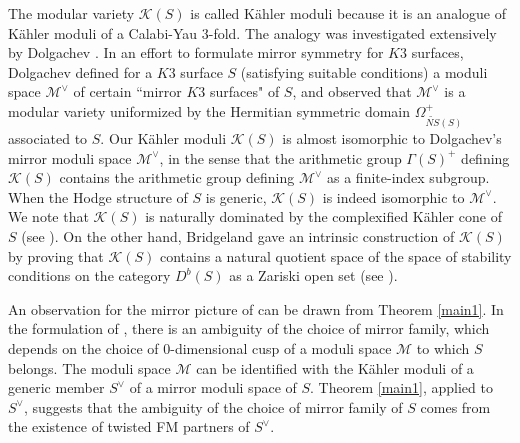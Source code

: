 \documentclass{article}
\theoremstyle{plain}
\theoremstyle{definition}
\theoremstyle{remark}
\begin{document}
The modular variety $\mathcal{K} (S)$ is called K\"ahler moduli  
because it is an analogue of K\"ahler moduli of a Calabi-Yau $3$-fold.   
The analogy was investigated extensively by Dolgachev \cite{Do}.  
In an effort to formulate mirror symmetry for $K3$ surfaces, 
Dolgachev defined for a $K3$ surface $S$ (satisfying suitable conditions)  
a moduli space $\mathcal{M}^{\vee}$ of certain ``mirror $K3$ surfaces" of $S$,  
and observed that $\mathcal{M}^{\vee}$ is a modular variety 
uniformized by the Hermitian symmetric domain $\Omega _{\widetilde{NS}(S)}^{+}$ associated to $S$.   
Our K\"ahler moduli $\mathcal{K} (S)$  
is almost isomorphic to Dolgachev's mirror moduli space $\mathcal{M}^{\vee}$, 
in the sense that 
the arithmetic group $\Gamma (S)^{+}$ defining $\mathcal{K} (S)$ 
contains the arithmetic group defining $\mathcal{M}^{\vee}$ as a finite-index subgroup.   
When the Hodge structure of $S$ is generic, 
$\mathcal{K} (S)$ is indeed isomorphic to $\mathcal{M}^{\vee}$.   
We note that $\mathcal{K} (S)$ is naturally dominated by the complexified K\"ahler cone of $S$ (see \cite{Do}).    
On the other hand,  
Bridgeland gave an intrinsic construction of $\mathcal{K} (S)$ 
by proving that $\mathcal{K} (S)$ contains 
a natural quotient space of the space of stability conditions on the category $D^{b}(S)$ 
as a Zariski open set (see \cite{Br}). 


An observation for the mirror picture of \cite{Do} can be drawn from Theorem \ref{main1}. 
In the formulation of \cite{Do},  
there is an ambiguity of the choice of mirror family,  
which depends on the choice of $0$-dimensional cusp of a moduli space $\mathcal{M}$ to which $S$ belongs.  
The moduli space $\mathcal{M}$ can be identified with 
the K\"ahler moduli of a generic member $S^{\vee}$ of a mirror moduli space of $S$.  
Theorem \ref{main1},  applied to $S^{\vee}$,  suggests that  
the ambiguity of the choice of mirror family of $S$ comes from the existence of twisted FM partners of $S^{\vee}$.   
\end{document}
